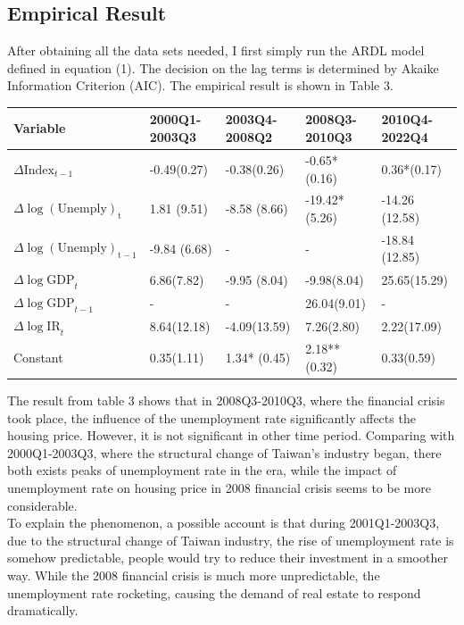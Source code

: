 \documentclass[12pt]{article}
\begin{document}
\begin{spacing}{2}
\section{Empirical Result}
After obtaining all the data sets needed, I first simply run the ARDL model defined in equation (1). The decision on the lag terms is determined by Akaike Information Criterion (AIC).  The empirical result is shown in Table 3.
\begin{center}
\begin{tabular}{ |p{3.5cm}||p{2.5cm}|p{2.5cm}|p{2.5cm}| p{2.5cm}|  }
 \hline
Variable & 2000Q1-2003Q3 &2003Q4-2008Q2 &2008Q3-2010Q3&2010Q4-2022Q4  \\
 \hline
 $\Delta{\mathrm{Index}_{t-1}}$  & -0.49(0.27)   &-0.38(0.26)&  -0.65*(0.16)&0.36*(0.17)\\
 $\Delta{\mathrm{\log(Unemply)_t}}$&  1.81 (9.51) &  -8.58 (8.66)    &-19.42*(5.26)& -14.26 (12.58)      \\
 $\Delta{\mathrm{\log(Unemply)_{t-1}}}$ & -9.84 (6.68)  &- & - & -18.84  (12.85)\\
 $\Delta{\log\mathrm{GDP}}_{t}$   &6.86(7.82) &-9.95 (8.04)  &  -9.98(8.04)&  25.65(15.29)\\
$\Delta{\log\mathrm{GDP}}_{t-1}$&-& -&26.04(9.01)&-\\
$\Delta{\log\mathrm{IR}}_{t}$&  8.64(12.18)  &   -4.09(13.59)   &7.26(2.80) &2.22(17.09) \\
 Constant& 0.35(1.11)   &  1.34* (0.45)& 2.18**(0.32)& 0.33(0.59) \\ \hline
\end{tabular}
\end{center}
The result from table 3 shows that in 2008Q3-2010Q3, where the financial crisis took place, the influence of the unemployment rate significantly affects the housing price. However, it is not significant in other time period. Comparing with 2000Q1-2003Q3, where the structural change of Taiwan's industry began, there both exists peaks of unemployment rate in the era, while the impact of unemployment rate on housing price in 2008 financial crisis seems to be more considerable. \\
\hspace*{0.5cm}To explain the phenomenon, a possible account is that during 2001Q1-2003Q3, due to the structural change of Taiwan industry, the rise of unemployment rate is somehow predictable, people would try to reduce their  investment in a smoother way. While the 2008 financial crisis is much more unpredictable, the unemployment rate rocketing, causing the demand of real estate to respond dramatically.\\

\end{spacing}
\end{document}
